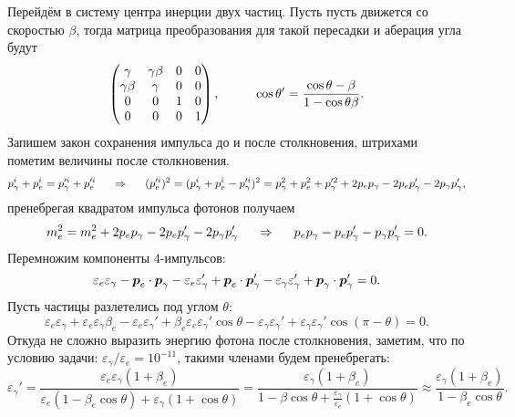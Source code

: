 Перейдём в систему центра инерции двух частиц. Пусть пусть движется со скоростью $\beta$, тогда матрица преобразования для такой пересадки и аберация угла будут
\begin{equation*}
 	\begin{pmatrix}
 	    \gamma & \gamma \beta & 0 & 0 \\
 	    \gamma \beta & \gamma & 0 & 0 \\
 	    0 & 0 & 1 & 0 \\
 	    0 & 0 & 0 & 1 \\
 	\end{pmatrix},
 	\hspace{1 cm}
 	\cos \theta' = \frac{\cos \theta - \beta}{1 - \cos \theta \beta}.
\end{equation*}
Запишем закон сохранения импульса до и после столкновения, штрихами пометим величины после столкновения.
\begin{equation*}
	p_\gamma^i + p_e^i = p_\gamma'^i + p_e'^i
	\hspace{0.5 cm}
	\Rightarrow
	\hspace{0.5 cm}
	(p_e'^i)^2 = (p_\gamma^i + p_e^i - p_\gamma'^i)^2
	=
	{p_\gamma^2} + p_e^2 + p_\gamma'^2 + 2 p_e p_\gamma - 2 p_e p_\gamma' - 2 p_\gamma p_\gamma',
\end{equation*}
пренебрегая квадратом импульса фотонов получаем
\begin{equation*}
	m_e^2 = m_e^2 + 2 p_e p_\gamma - 2 p_e p_\gamma' - 2 p_\gamma p_\gamma'
	\hspace{0.5 cm}
	\Rightarrow
	\hspace{0.5 cm}
	p_e p_\gamma -  p_e p_\gamma' -  p_\gamma p_\gamma' = 0.
\end{equation*}
Перемножим компоненты 4-импульсов:
\begin{equation*}
	\varepsilon_e \varepsilon_\gamma - \mbox{\boldmath $p$}_e \cdot \mbox{\boldmath $p$}_\gamma - \varepsilon_e \varepsilon_\gamma' + \mbox{\boldmath $p$}_e \cdot \mbox{\boldmath $p$}_\gamma' - \varepsilon_\gamma \varepsilon_\gamma' + \mbox{\boldmath $p$}_\gamma \cdot \mbox{\boldmath $p$}_\gamma' = 0.
\end{equation*}
Пусть частицы разлетелись под углом $\theta$:
\begin{equation*}
	\varepsilon_e \varepsilon_\gamma + \varepsilon_e \varepsilon_\gamma \beta_e - \varepsilon_e \varepsilon_\gamma' + \beta_e \varepsilon_e \varepsilon_\gamma' \cos \theta - \varepsilon_\gamma \varepsilon_\gamma' + \varepsilon_\gamma \varepsilon_\gamma' \cos (\pi-\theta) = 0.
\end{equation*}
Откуда не сложно выразить энергию фотона после столкновения, заметим, что по условию задачи: $\varepsilon_\gamma/\varepsilon_e = 10^{-11}$, такими членами будем пренебрегать:
\begin{equation*}
	\varepsilon_\gamma' = \frac{\varepsilon_e \varepsilon_\gamma(1 + \beta_e)}{\varepsilon_e (1 - \beta_e \cos \theta) + \varepsilon_\gamma (1 + \cos \theta)}
	=
	\frac{\varepsilon_\gamma (1 + \beta_e)}{1 - \beta \cos \theta + \frac{\varepsilon_\gamma}{\varepsilon_e}(1 + \cos \theta)} 
	\approx \frac{\varepsilon_\gamma (1 + \beta_e)}{1 - \beta_e \cos \theta}.
\end{equation*}


